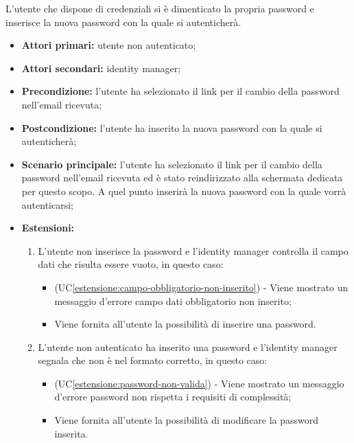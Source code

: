 L'utente che dispone di credenziali si è dimenticato la propria password e inserisce la nuova password con la quale si autenticherà.
\begin{itemize}
	\item \textbf{Attori primari:} utente non autenticato;
	\item \textbf{Attori secondari:} identity manager;
	\item \textbf{Precondizione:} l'utente ha selezionato il link per il cambio della password nell'email ricevuta;
	\item \textbf{Postcondizione:} l'utente ha inserito la nuova password con la quale si autenticherà;
	\item \textbf{Scenario principale:} l'utente ha selezionato il link per il cambio della password nell'email ricevuta ed è stato reindirizzato alla schermata dedicata per questo scopo. A quel punto inserirà la nuova password con la quale vorrà autenticarsi;
	\item \textbf{Estensioni:}
	\begin{enumerate}[label=\lett]
		\item L'utente non inserisce la password e l'identity manager controlla il campo dati che risulta essere vuoto, in questo caso:
		\begin{itemize}
			\item (UC\ref{estensione:campo-obbligatorio-non-inserito}) - Viene mostrato un messaggio d'errore campo dati obbligatorio non inserito;
			\item Viene fornita all'utente la possibilità di inserire una password.
		\end{itemize}
		\item L'utente non autenticato ha inserito una password e l'identity manager segnala che non è nel formato corretto, in questo caso:
		\begin{itemize}
			\item (UC\ref{estensione:password-non-valida}) - Viene mostrato un messaggio d'errore password non rispetta i requisiti di complessità;
			\item Viene fornita all'utente la possibilità di modificare la password inserita.
		\end{itemize}
	\end{enumerate}
\end{itemize}

\label{password-dimenticata.conferma-password}

